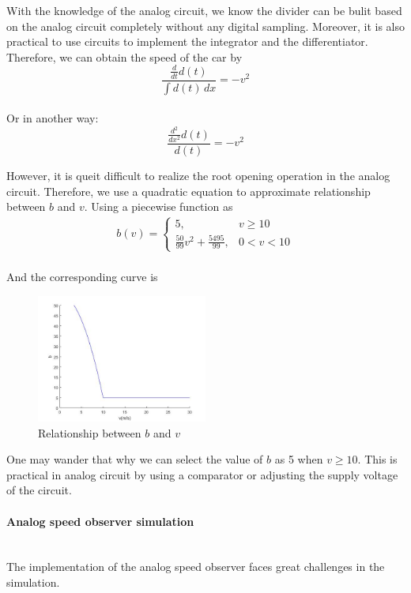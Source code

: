 \documentclass{article}
\newcommand{\subsubsubsection}[1]{\paragraph{#1}\mbox{}\\}
\begin{document}
With the knowledge of the analog circuit,
we know the divider can be bulit based on the analog circuit completely without any digital sampling.
Moreover, it is also practical to use circuits to implement the integrator and the differentiator.
Therefore, we can obtain the speed of the car by
\begin{equation*}
    \frac{\frac{d }{d t}d(t)}{\int d(t) \,dx} = -v^2
\end{equation*}\\

Or in another way:
\begin{equation*}
    \frac{\frac{d^2}{d x^2} d(t)}{d(t)}=-v^2
\end{equation*}

However, it is queit difficult to realize the root opening operation in the analog circuit.
Therefore, we use a quadratic equation to approximate relationship between $b$ and $v$.
Using a piecewise function as 
\begin{align*}
    b(v) = \begin{cases}
        5, & v\geq 10\\
        \frac{50}{99}v^2+\frac{5495}{99}, & 0<v<10
    \end{cases}
\end{align*}\\

And the corresponding curve is
\begin{figure}[htbp]
    \centering
    \includegraphics[width=0.5\textwidth]{14.jpg}
    \caption{Relationship between $b$ and $v$}
\end{figure}

One may wander that why we can select the value of $b$ as 5 when $v\geq 10$.
This is practical in analog circuit by using a comparator or adjusting the supply voltage of the circuit.\\

\subsubsubsection{Analog speed observer simulation}

The implementation of the analog speed observer faces great challenges in the simulation.\\
\end{document}
